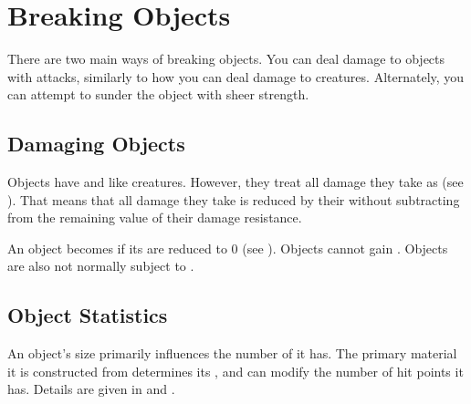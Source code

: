 \section{Breaking Objects}
    There are two main ways of breaking objects.
    You can deal damage to objects with attacks, similarly to how you can deal damage to creatures.
    Alternately, you can attempt to sunder the object with sheer strength.

    \subsection{Damaging Objects}
        Objects have  and  like creatures.
        However, they treat all damage they take as  (see ).
        That means that all damage they take is reduced by their  without subtracting from the remaining value of their damage resistance.

        An object becomes  if its  are reduced to 0 (see ).
        Objects cannot gain .
        Objects are also not normally subject to .

    \subsection{Object Statistics}
        An object's size primarily influences the number of  it has.
        The primary material it is constructed from determines its , and can modify the number of hit points it has.
        Details are given in  and .

